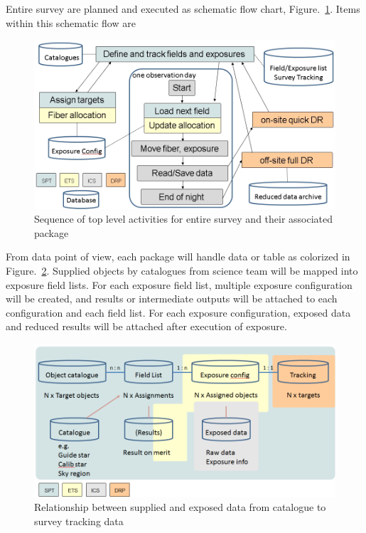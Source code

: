 \documentclass[a4paper,notitlepage]{article}
\begin{document}
Entire survey are planned and executed as schematic flow chart, 
Figure.~\ref{fig:sciops-scireq-slide-softcoord}. 
Items within this schematic flow are 


\begin{figure}[htb]
  \begin{center}
    \includegraphics[width=.75\linewidth]{sciops-scireq-slide-softcoord.png}
  \end{center}
  \caption{Sequence of top level activities for entire survey and 
    their associated package}
  \label{fig:sciops-scireq-slide-softcoord}
\end{figure}


From data point of view, each package will handle data or table as colorized 
in Figure.~\ref{fig:sciops-scireq-slide-data}. 
Supplied objects by catalogues from science team will be mapped into 
exposure field lists. For each exposure field list, multiple exposure 
configuration will be created, and results or intermediate outputs 
will be attached to each configuration and each field list. 
For each exposure configuration, exposed data and reduced results will be 
attached after execution of exposure. 

\begin{figure}[htb]
  \begin{center}
    \includegraphics[width=.75\linewidth]{sciops-scireq-slide-data.png}
  \end{center}
  \caption{Relationship between supplied and exposed data from catalogue to 
    survey tracking data}
  \label{fig:sciops-scireq-slide-data}
\end{figure}
\end{document}
